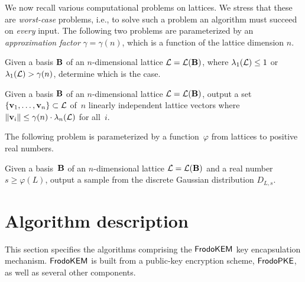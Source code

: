 \documentclass{iacrcc}
\begin{document}
We now recall various computational problems on lattices. We stress
that these are \emph{worst-case} problems, i.e., to solve such a
problem an algorithm must succeed on \emph{every} input. The following
two problems are parameterized by an \emph{approximation factor}
$\gamma = \gamma(n)$, which is a function of the lattice dimension $n$.

\begin{definition}
  \label{def:GapSVP}
  Given a basis $\mathbf{B}$ of an $n$-dimensional lattice
  $\mathcal{L} = \mathcal{L}(\mathbf{B})$, where $\lambda_1(\mathcal{L}) \leq 1$ or
  $\lambda_1(\mathcal{L}) > \gamma(n)$, determine which is the case.
\end{definition}

\begin{definition}
  \label{def:SIVP}
  Given a basis $\mathbf{B}$ of an $n$-dimensional lattice
  $\mathcal{L} = \mathcal{L}(\mathbf{B})$, output a set
  $\{ \mathbf{v}_{1}, \ldots, \mathbf{v}_{n} \} \subset \mathcal{L}$ of~$n$ linearly
  independent lattice vectors where
  $\lVert \mathbf{v}_i \rVert \leq \gamma(n) \cdot \lambda_n(\mathcal{L})$ for all~$i$.
\end{definition}

The following problem is parameterized by a function~$\varphi$ from
lattices to positive real numbers.

\begin{definition}
  \label{def:DGS}
  Given a basis~$\mathbf{B}$ of an $n$-dimensional lattice $\mathcal{L} =
  \mathcal{L}(\mathbf{B})$ and a real number $s \geq \varphi(L)$, output a sample
  from the discrete Gaussian distribution $D_{L,s}$.
\end{definition}

\section{Algorithm description}\label{sec:algs}

This section specifies the algorithms comprising the $\textsf{\upshape\mdseries FrodoKEM}$ key encapsulation mechanism.  $\textsf{\upshape\mdseries FrodoKEM}$ is built from a public-key encryption scheme, $\textsf{\upshape\mdseries FrodoPKE}$, as well as several other components.
\end{document}
